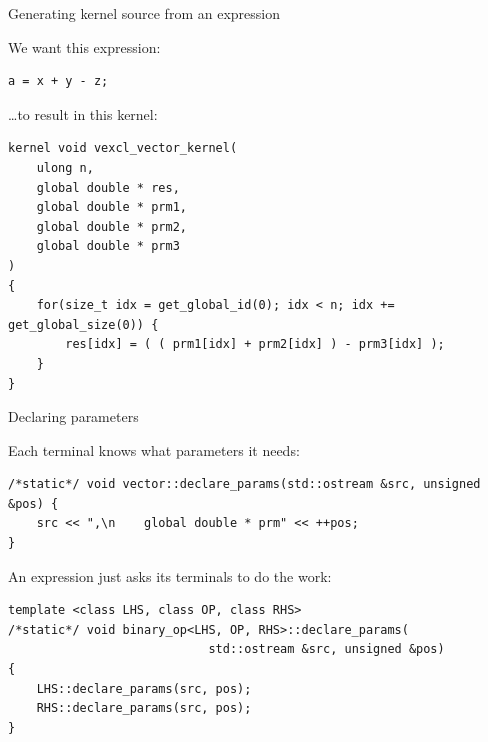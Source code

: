 \documentclass[@BEAMER_OPTIONS@]{beamer}
\begin{document}
\note{ }

\begin{frame}[fragile]{Generating kernel source from an expression}
    \begin{exampleblock}{We want this expression:}
        \begin{lstlisting}
a = x + y - z;
        \end{lstlisting}
    \end{exampleblock}
    \begin{exampleblock}{\ldots to result in this kernel:}
        \begin{lstlisting}
kernel void vexcl_vector_kernel(
    ulong n,
    global double * res,
    global double * prm1,
    global double * prm2,
    global double * prm3
)
{
    for(size_t idx = get_global_id(0); idx < n; idx += get_global_size(0)) {
        res[idx] = ( ( prm1[idx] + prm2[idx] ) - prm3[idx] );
    }
}
        \end{lstlisting}
    \end{exampleblock}
\end{frame}

\note{ }

\begin{frame}[fragile]{Declaring parameters}
    \begin{exampleblock}{Each terminal knows what parameters it needs:}
        \begin{lstlisting}
/*static*/ void vector::declare_params(std::ostream &src, unsigned &pos) {
    src << ",\n    global double * prm" << ++pos;
}
        \end{lstlisting}
    \end{exampleblock}
    \begin{exampleblock}{An expression just asks its terminals to do the work:}
        \begin{lstlisting}[firstnumber=last]
template <class LHS, class OP, class RHS>
/*static*/ void binary_op<LHS, OP, RHS>::declare_params(
                            std::ostream &src, unsigned &pos)
{
    LHS::declare_params(src, pos);
    RHS::declare_params(src, pos);
}
        \end{lstlisting}
    \end{exampleblock}
\end{frame}
\end{document}
